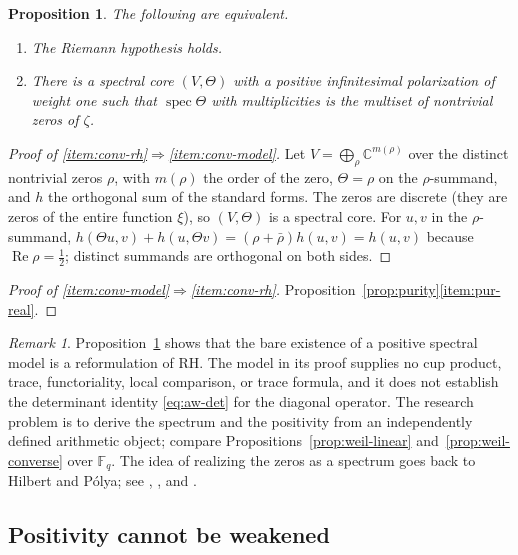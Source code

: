 \documentclass[11pt]{amsart}
\theoremstyle{plain}
\newtheorem{proposition}[theorem]{Proposition}
\theoremstyle{definition}
\theoremstyle{remark}
\newtheorem{remark}[theorem]{Remark}
\numberwithin{equation}{section}
\newcommand{\C}{\mathbb{C}}
\newcommand{\F}{\mathbb{F}}
\DeclareMathOperator{\spec}{spec}
\DeclareMathOperator{\Rea}{Re}
\renewcommand{\Re}{\Rea}
\begin{document}
\begin{proposition}\label{prop:converse}
The following are equivalent.
\begin{enumerate}[label=(\roman*)]
\item\label{item:conv-rh} The Riemann hypothesis holds.
\item\label{item:conv-model} There is a spectral core $(V,\Theta)$ with
  a positive infinitesimal polarization of weight one such that
  $\spec\Theta$ with
  multiplicities is the multiset of nontrivial zeros of $\zeta$.
\end{enumerate}
\end{proposition}

\begin{proof}[Proof of \ref{item:conv-rh}$\Rightarrow$\ref{item:conv-model}]
Let $V=\bigoplus_\rho\C^{m(\rho)}$ over the distinct nontrivial zeros
$\rho$, with $m(\rho)$ the order of the zero, $\Theta=\rho$ on the
$\rho$-summand, and $h$ the orthogonal sum of the standard forms. The
zeros are discrete (they are zeros of the entire function $\xi$), so
$(V,\Theta)$ is a spectral core. For $u,v$ in the $\rho$-summand,
$h(\Theta u,v)+h(u,\Theta v)=(\rho+\bar\rho)h(u,v)=h(u,v)$ because
$\Re\rho=\tfrac12$; distinct summands are orthogonal on both sides.
\end{proof}

\begin{proof}[Proof of \ref{item:conv-model}$\Rightarrow$\ref{item:conv-rh}]
Proposition~\ref{prop:purity}\ref{item:pur-real}.
\end{proof}

\begin{remark}\label{rem:reformulation}
Proposition~\ref{prop:converse} shows that the bare existence of a
positive spectral model is a reformulation of RH. The model in its
proof supplies no cup product, trace, functoriality, local comparison, or
trace formula, and it does not establish the determinant identity
\eqref{eq:aw-det} for the diagonal operator. The research problem is to
derive the spectrum and the positivity from an independently defined
arithmetic object; compare Propositions~\ref{prop:weil-linear}
and~\ref{prop:weil-converse} over $\F_q$. The idea of realizing the
zeros as a spectrum goes back to Hilbert and P\'olya; see
\cite[p.~3]{Connes1998TraceFormula}, \cite[p.~147]{Deninger1992Local},
and \cite[p.~5]{Sarnak2004Clay}.
\end{remark}

\subsection{Positivity cannot be weakened}\label{subsec:witnesses}
\end{document}
